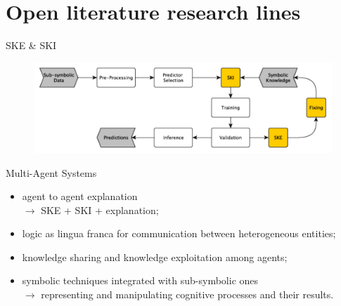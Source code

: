 \documentclass[presentation]{beamer}\mode<presentation>{\usetheme{AMSBolognaFC}}
\begin{document}
\section{Open literature research lines}


\begin{frame}[c]{SKE \& SKI}
    \begin{figure}
        \centering
        \includegraphics[width=\textwidth]{figures/ske-ski-workflow}
    \end{figure}
\end{frame}


\begin{frame}[c]{Multi-Agent Systems}
    \begin{itemize}
        \item agent to agent explanation \\
        $\rightarrow$ SKE + SKI + explanation;
        \item logic as lingua franca for communication between heterogeneous entities;
        \item knowledge sharing and knowledge exploitation among agents;
        \item symbolic techniques integrated with sub-symbolic ones\\
        $\rightarrow$ representing and manipulating cognitive
        processes and their results.
    \end{itemize}
\end{frame}

\section*{}
\end{document}

